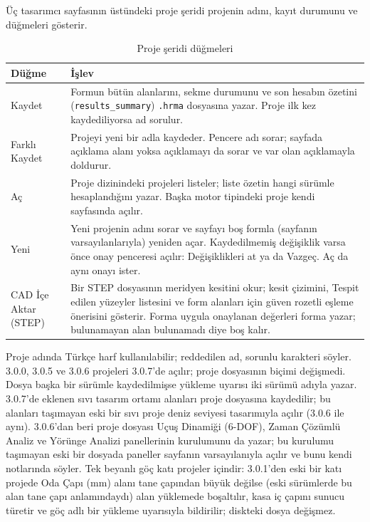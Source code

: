 \documentclass[11pt,a4paper]{article}
\newcommand{\ui}[1]{\textsf{#1}}
\newcommand{\kod}[1]{\texttt{#1}}
\begin{document}
Üç tasarımcı sayfasının üstündeki proje şeridi projenin adını, kayıt durumunu
ve düğmeleri gösterir.

\begin{table}[htbp]
\centering\small
\caption{Proje şeridi düğmeleri}\label{tab:projeseridi}
\begin{tabular}{@{}>{\raggedright\arraybackslash}p{3.6cm}>{\raggedright\arraybackslash}p{12.0cm}@{}}
\toprule
\textbf{Düğme} & \textbf{İşlev} \\
\midrule
\ui{Kaydet} & Formun bütün alanlarını, sekme durumunu ve son hesabın özetini (\kod{results\_\allowbreak{}summary}) \kod{.hrma} dosyasına yazar. Proje ilk kez kaydediliyorsa ad sorulur. \\
\ui{Farklı Kaydet} & Projeyi yeni bir adla kaydeder. Pencere adı sorar; sayfada açıklama alanı yoksa açıklamayı da sorar ve var olan açıklamayla doldurur. \\
\ui{Aç} & Proje dizinindeki projeleri listeler; liste özetin hangi sürümle hesaplandığını yazar. Başka motor tipindeki proje kendi sayfasında açılır. \\
\ui{Yeni} & Yeni projenin adını sorar ve sayfayı boş formla (sayfanın varsayılanlarıyla) yeniden açar. Kaydedilmemiş değişiklik varsa önce onay penceresi açılır: \ui{Değişiklikleri at} ya da \ui{Vazgeç}. \ui{Aç} da aynı onayı ister. \\
\ui{CAD İçe Aktar (STEP)} & Bir STEP dosyasının meridyen kesitini okur; kesit çizimini, \ui{Tespit edilen yüzeyler} listesini ve form alanları için güven rozetli eşleme önerisini gösterir. \ui{Forma uygula} onaylanan değerleri forma yazar; bulunamayan alan \ui{bulunamadı} diye boş kalır. \\
\bottomrule
\end{tabular}
\end{table}

Proje adında Türkçe harf kullanılabilir; reddedilen ad, sorunlu karakteri
söyler. 3.0.0, 3.0.5 ve 3.0.6 projeleri 3.0.7'de açılır; proje dosyasının
biçimi değişmedi. Dosya başka bir sürümle kaydedilmişse yükleme uyarısı iki
sürümü adıyla yazar. 3.0.7'de eklenen sıvı tasarım ortamı alanları proje
dosyasına kaydedilir; bu alanları taşımayan eski bir sıvı proje deniz
seviyesi tasarımıyla açılır (3.0.6 ile aynı). 3.0.6'dan beri proje dosyası Uçuş Dinamiği (6-DOF), Zaman Çözümlü Analiz ve
Yörünge Analizi panellerinin kurulumunu da yazar; bu kurulumu taşımayan eski bir dosyada
paneller sayfanın varsayılanıyla açılır ve bunu kendi notlarında söyler. Tek
beyanlı göç katı projeler içindir: 3.0.1'den eski bir katı projede \ui{Oda Çapı (mm)} alanı tane
çapından büyük değilse (eski sürümlerde bu alan tane çapı anlamındaydı) alan
yüklemede boşaltılır, kasa iç çapını sunucu türetir ve göç adlı bir yükleme
uyarısıyla bildirilir; diskteki dosya değişmez.
\end{document}
